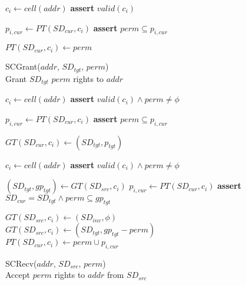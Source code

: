 \begin{figure}
\begin{multicols}{2}
\begin{algorithm}[H]
\begin{algorithmic}[1]
        \State $c_i \gets cell(addr)$
        \State \textbf{assert} $valid(c_i)$

        \State $p_{i,cur} \gets PT(SD_{cur}, c_i) $
        \State \textbf{assert} $perm \subseteq p_{i,cur}$

        \State $PT(SD_{cur}, c_i) \gets perm$
      \end{algorithmic}
      \label{alg:seccells:scprotect}
    \end{algorithm}
    \vspace{-0.5\baselineskip}

    \begin{algorithm}[H]
      \caption{SCGrant($addr$, $SD_{tgt}$, $perm$) \\
      Grant $SD_{tgt}$ $perm$ rights to $addr$             }
      \begin{algorithmic}[1]

        \State $c_i \gets cell(addr)$
        \State \textbf{assert} $valid(c_i) \land perm \ne \phi$

        \State $p_{i,cur} \gets PT(SD_{cur}, c_i)$
        \State \textbf{assert} $perm \subseteq p_{i,cur}$

        \State $GT(SD_{cur}, c_i) \gets (SD_{tgt}, p_{tgt})$
      \end{algorithmic}
      \label{alg:seccells:scgrant}
    \end{algorithm}
    \vspace{-0.5\baselineskip}

    \begin{algorithm}[H]
      \caption{SCRecv($addr$, $SD_{src}$, $perm$) \\
      Accept $perm$ rights to $addr$ from $SD_{src}$      }
      \begin{algorithmic}[1]

        \State $c_i \gets cell(addr)$
        \State \textbf{assert} $valid(c_i) \land perm \ne \phi$

        \State $(SD_{tgt}, gp_{tgt}) \gets GT(SD_{src}, c_i)$
        \State $p_{i,cur} \gets PT(SD_{cur}, c_i)$
        \State \textbf{assert} $SD_{cur} = SD_{tgt} \land perm \subseteq gp_{tgt}$

          \State $GT(SD_{src}, c_i) \gets (SD_{inv}, \phi)$
        \Else
          \State $GT(SD_{src}, c_i) \gets (SD_{tgt}, gp_{tgt} - perm)$
        \EndIf
        \State $PT(SD_{cur}, c_i) \gets perm \cup p_{i, cur} $

      \end{algorithmic}
      \label{alg:seccells:screcv}
    \end{algorithm}
    \vspace{-\baselineskip}


\end{multicols}
\end{figure}
